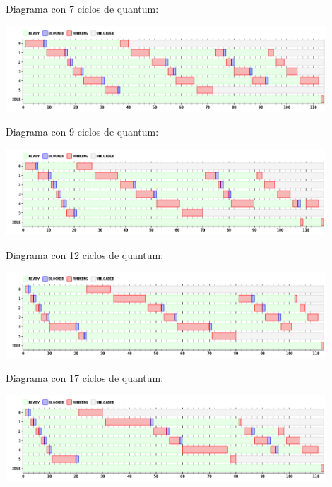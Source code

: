 \par Diagrama con 7 ciclos de quantum:
\begin {center}
\includegraphics[width=12cm]{../simusched/outputs/ej7/rr-ej7-1-7.png}
\end {center}

\par Diagrama con 9 ciclos de quantum:
\begin {center}
\includegraphics[width=12cm]{../simusched/outputs/ej7/rr-ej7-1-9.png}
\end {center}

\par Diagrama con 12 ciclos de quantum:
\begin {center}
\includegraphics[width=12cm]{../simusched/outputs/ej7/rr-ej7-1-12.png}
\end {center}

\par Diagrama con 17 ciclos de quantum:
\begin {center}
\includegraphics[width=12cm]{../simusched/outputs/ej7/rr-ej7-1-17.png}
\end {center}

